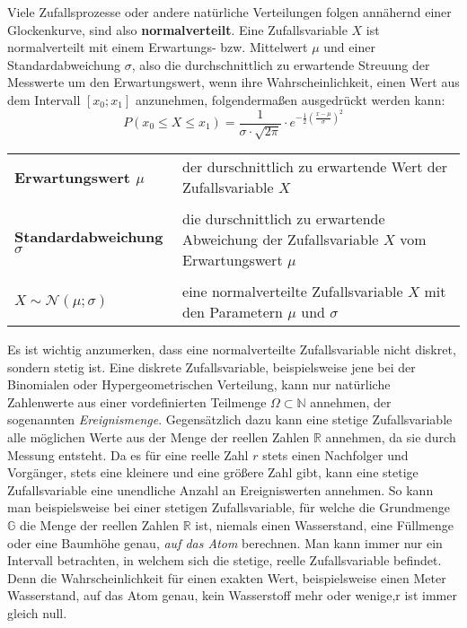 



\thispagestyle{plain}


Viele Zufallsprozesse oder andere nat\"{u}rliche Verteilungen folgen ann\"{a}hernd einer Glockenkurve, sind also \textbf{normalverteilt}. Eine Zufallsvariable $X$ ist normalverteilt mit einem Erwartungs- bzw. Mittelwert $\mu$ und einer Standardabweichung $\sigma$, also die durchschnittlich zu erwartende Streuung der Messwerte um den Erwartungswert, wenn ihre Wahrscheinlichkeit, einen Wert aus dem Intervall $[x_{0} ; x_{1}]$ anzunehmen, folgenderma\ss{}en ausgedr\"{u}ckt werden kann: $$P(x_{0} \leq X \leq x_{1}) = \frac{1}{\sigma \cdot \sqrt{2\pi}} \cdot e^{-\frac{1}{2}\left(\frac{x - \mu}{\sigma}\right)^2}$$

\begin{tabular}{l p{11cm}}
	\textbf{Erwartungswert $\mu$} &  der durschnittlich zu erwartende Wert der Zufallsvariable $X$
	\\ & \\
	\textbf{Standardabweichung $\sigma$} &  die durschnittlich zu erwartende Abweichung der Zufallsvariable $X$ vom Erwartungswert $\mu$
	\\ & \\
	\textbf{$X \sim \mathcal{N}(\mu; \sigma)$} &  eine normalverteilte Zufallsvariable $X$ mit den Parametern $\mu$ und $\sigma$
\end{tabular}

Es ist wichtig anzumerken, dass eine normalverteilte Zufallsvariable nicht diskret, sondern stetig ist. Eine diskrete Zufallsvariable, beispielsweise jene bei der Binomialen oder Hypergeometrischen Verteilung, kann nur nat\"{u}rliche Zahlenwerte aus einer vordefinierten Teilmenge $\Omega \subset \mathbb{N}$ annehmen, der sogenannten \emph{Ereignismenge}. Gegens\"{a}tzlich dazu kann eine stetige Zufallsvariable alle m\"{o}glichen Werte aus der Menge der reellen Zahlen $\mathbb{R}$ annehmen, da sie durch Messung entsteht. Da es f\"{u}r eine reelle Zahl $r$ stets einen Nachfolger und Vorg\"{a}nger, stets eine kleinere und eine gr\"{o}\ss{}ere Zahl gibt, kann eine stetige Zufallsvariable eine unendliche Anzahl an Ereigniswerten annehmen. So kann man beispielsweise bei einer stetigen Zufallsvariable, f\"{u}r welche die Grundmenge $\mathbb{G}$ die Menge der reellen Zahlen $\mathbb{R}$ ist, niemals einen Wasserstand, eine F\"{u}llmenge oder eine Baumh\"{o}he genau, \emph{auf das Atom} berechnen. Man kann immer nur ein Intervall betrachten, in welchem sich die stetige, reelle Zufallsvariable befindet. Denn die Wahrscheinlichkeit f\"{u}r einen exakten Wert, beispielsweise einen Meter Wasserstand, auf das Atom genau, kein Wasserstoff mehr oder wenige,r ist immer gleich null. 

